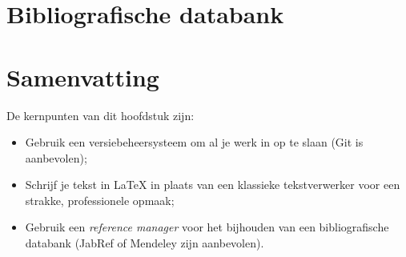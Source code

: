 

\section{Bibliografische databank}
\label{sec:bibliografische-databank}

\section{Samenvatting}
\label{sec:voorbereiding-samenvatting}

De kernpunten van dit hoofdstuk zijn:

\begin{itemize}
  \item Gebruik een versiebeheersysteem om al je werk in op te slaan (Git is aanbevolen);
  \item Schrijf je tekst in {\LaTeX} in plaats van een klassieke tekstverwerker voor een strakke, professionele opmaak;
  \item Gebruik een \emph{reference manager} voor het bijhouden van een bibliografische databank (JabRef of Mendeley zijn aanbevolen).
\end{itemize}
